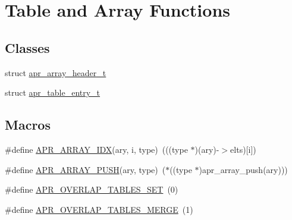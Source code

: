 \hypertarget{group__apr__tables}{}\section{Table and Array Functions}
\label{group__apr__tables}
\subsection*{Classes}
\begin{DoxyCompactItemize}
\item 
struct \mbox{\hyperlink{structapr__array__header__t}{apr\+\_\+array\+\_\+header\+\_\+t}}
\item 
struct \mbox{\hyperlink{structapr__table__entry__t}{apr\+\_\+table\+\_\+entry\+\_\+t}}
\end{DoxyCompactItemize}
\subsection*{Macros}
\begin{DoxyCompactItemize}
\item 
\#define \mbox{\hyperlink{group__apr__tables_ga84066caaa4c7632671af18c229809fc4}{A\+P\+R\+\_\+\+A\+R\+R\+A\+Y\+\_\+\+I\+DX}}(ary,  i,  type)~(((type $\ast$)(ary)-\/$>$elts)\mbox{[}i\mbox{]})
\item 
\#define \mbox{\hyperlink{group__apr__tables_ga1833b0f940ec03d0b95926812152e1ca}{A\+P\+R\+\_\+\+A\+R\+R\+A\+Y\+\_\+\+P\+U\+SH}}(ary,  type)~($\ast$((type $\ast$)apr\+\_\+array\+\_\+push(ary)))
\item 
\#define \mbox{\hyperlink{group__apr__tables_ga867455bb7008872e03b08c0742f9698c}{A\+P\+R\+\_\+\+O\+V\+E\+R\+L\+A\+P\+\_\+\+T\+A\+B\+L\+E\+S\+\_\+\+S\+ET}}~(0)
\item 
\#define \mbox{\hyperlink{group__apr__tables_ga553eea6eb6fea4bafaf4cbd7acafdf5f}{A\+P\+R\+\_\+\+O\+V\+E\+R\+L\+A\+P\+\_\+\+T\+A\+B\+L\+E\+S\+\_\+\+M\+E\+R\+GE}}~(1)
\end{DoxyCompactItemize}
